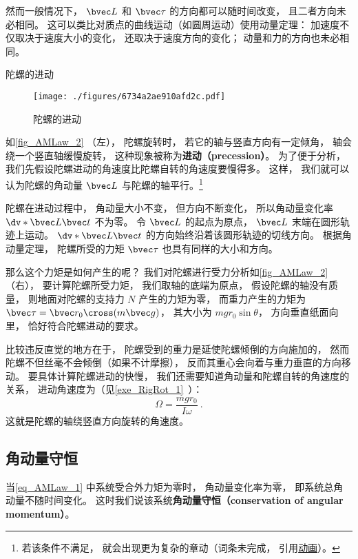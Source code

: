 然而一般情况下， $\bvec L$ 和 $\bvec \tau$ 的方向都可以随时间改变， 且二者方向未必相同。 这可以类比对质点的曲线运动（如圆周运动）使用动量定理： 加速度不仅取决于速度大小的变化， 还取决于速度方向的变化； 动量和力的方向也未必相同。
\begin{example}{陀螺的进动}\label{ex_AMLaw_2}
\begin{figure}[ht]
\centering
\texttt{[image: ./figures/6734a2ae910afd2c.pdf]}
\caption{陀螺的进动}\label{fig_AMLaw_2}
\end{figure}

如\autoref{fig_AMLaw_2} （左）， 陀螺旋转时， 若它的轴与竖直方向有一定倾角， 轴会绕一个竖直轴缓慢旋转， 这种现象被称为\textbf{进动（precession）}。 为了便于分析， 我们先假设陀螺进动的角速度比陀螺自转的角速度要慢得多。 这样， 我们就可以认为陀螺的角动量 $\bvec L$ 与陀螺的轴平行。\footnote{若该条件不满足， 就会出现更为复杂的章动（词条未完成， 引用\href{https://wuli.wiki/apps/Top.html}{动画}）。}

陀螺在进动过程中， 角动量大小不变， 但方向不断变化， 所以角动量变化率 $\dv*{\bvec L}{\bvec t}$ 不为零。 令 $\bvec L$ 的起点为原点， $\bvec L$ 末端在圆形轨迹上运动。 $\dv*{\bvec L}{\bvec t}$ 的方向始终沿着该圆形轨迹的切线方向。 根据角动量定理， 陀螺所受的力矩 $\bvec \tau$ 也具有同样的大小和方向。

那么这个力矩是如何产生的呢？ 我们对陀螺进行受力分析如\autoref{fig_AMLaw_2} （右）， 要计算陀螺所受力矩， 我们取轴的底端为原点， 假设陀螺的轴没有质量， 则地面对陀螺的支持力 $N$ 产生的力矩为零， 而重力产生的力矩为 $\bvec \tau = \bvec r_0 \cross (m\bvec g)$， 其大小为 $mgr_0\sin\theta$， 方向垂直纸面向里， 恰好符合陀螺进动的要求。

比较违反直觉的地方在于， 陀螺受到的重力是延使陀螺倾倒的方向施加的， 然而陀螺不但丝毫不会倾倒（如果不计摩擦）， 反而其重心会向着与重力垂直的方向移动。 要具体计算陀螺进动的快慢， 我们还需要知道角动量和陀螺自转的角速度的关系， 进动角速度为（见\autoref{exe_RigRot_1}~）：
\begin{equation}\label{eq_AMLaw_2}
\Omega = \frac{mgr_0}{I\omega}~.
\end{equation}
这就是陀螺的轴绕竖直方向旋转的角速度。
\end{example}

\subsection{角动量守恒}
当\autoref{eq_AMLaw_1} 中系统受合外力矩为零时， 角动量变化率为零， 即系统总角动量不随时间变化。 这时我们说该系统\textbf{角动量守恒（conservation of angular momentum）}。

